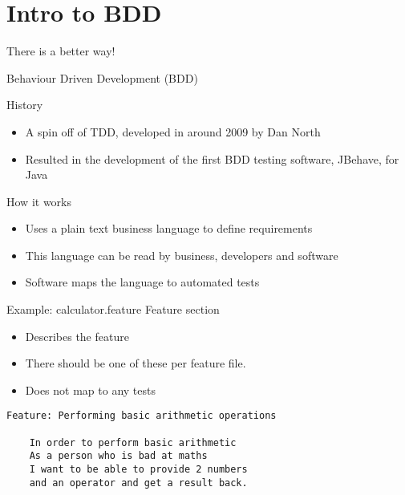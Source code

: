 \documentclass[bigger]{beamer}
\begin{document}
\section{Intro to BDD}
\label{sec:orgcd5cf34}
\begin{frame}[label={sec:orgf8a0578}]{There is a better way!}
\begin{block}{Behaviour Driven Development (BDD)}
\begin{block}{History}
\begin{itemize}
\item A spin off of TDD, developed in around 2009 by Dan North
\item Resulted in the development of the first BDD testing software, JBehave, for Java
\end{itemize}
\end{block}
\begin{block}{How it works}
\begin{itemize}
\item Uses a plain text business language to define requirements
\item This language can be read by business, developers and software
\item Software maps the language to automated tests
\end{itemize}
\end{block}
\end{block}
\end{frame}

\begin{frame}[fragile,label={sec:org1e33018}]{Example: calculator.feature Feature section}
 \begin{itemize}
\item Describes the feature
\item There should be one of these per feature file.
\item Does not map to any tests
\end{itemize}
\begin{verbatim}
Feature: Performing basic arithmetic operations

    In order to perform basic arithmetic
    As a person who is bad at maths
    I want to be able to provide 2 numbers
    and an operator and get a result back.
\end{verbatim}
\end{frame}
\end{document}
